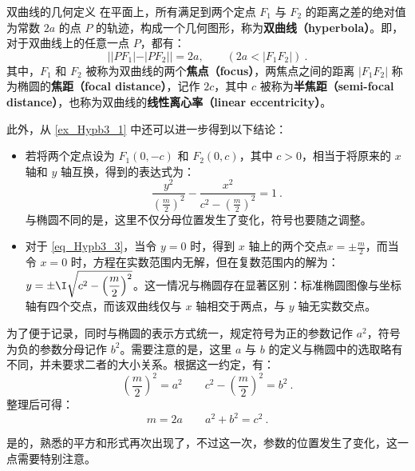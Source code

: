 \begin{definition}{双曲线的几何定义}
在平面上，所有满足到两个定点 $F_1$ 与 $F_2$ 的距离之差的绝对值为常数 $2a$ 的点 $P$ 的轨迹，构成一个几何图形，称为\textbf{双曲线（hyperbola）}。即，对于双曲线上的任意一点 $P$，都有：
\begin{equation}
||PF_1| - |PF_2|| = 2a ,\qquad(2a<|F_1F_2|)~.
\end{equation}
其中，$F_1$ 和 $F_2$ 被称为双曲线的两个\textbf{焦点（focus）}，两焦点之间的距离 $|F_1F_2|$ 称为椭圆的\textbf{焦距（focal distance）}，记作 $2c$，其中 $c$ 被称为\textbf{半焦距（semi-focal distance）}，也称为双曲线的\textbf{线性离心率（linear eccentricity）}。
\end{definition}

此外，从 \autoref{ex_Hypb3_1} 中还可以进一步得到以下结论：

\begin{itemize}
\item 若将两个定点设为 $F_1(0,-c)$ 和 $F_2(0,c)$，其中 $c > 0$，相当于将原来的 $x$ 轴和 $y$ 轴互换，得到的表达式为：
\begin{equation}\label{eq_Hypb3_7}
\frac{y^2}{\left(\displaystyle\frac{m}{2}\right)^2}-\frac{x^2}{\displaystyle c^2-\left(\frac{m}{2}\right)^2} =1~.
\end{equation}
与椭圆不同的是，这里不仅分母位置发生了变化，符号也要随之调整。
\item 对于 \autoref{eq_Hypb3_3}，当令 $y = 0$ 时，得到 $x$ 轴上的两个交点$\displaystyle x = \pm \frac{m}{2}$，而当令 $x = 0$ 时，方程在实数范围内无解，但在复数范围内的解为：$y = \displaystyle\pm \I \sqrt{c^2 - \left( \frac{m}{2} \right)^2}$。这一情况与椭圆存在显著区别：标准椭圆图像与坐标轴有四个交点，而该双曲线仅与 $x$ 轴相交于两点，与 $y$ 轴无实数交点。
\end{itemize}

为了便于记录，同时与椭圆的表示方式统一，规定符号为正的参数记作 $a^2$，符号为负的参数分母记作 $b^2$。需要注意的是，这里 $a$ 与 $b$ 的定义与椭圆中的选取略有不同，并未要求二者的大小关系。根据这一约定，有：
\begin{equation}
\left(\displaystyle\frac{m}{2}\right)^2=a^2\qquad c^2-\displaystyle\left(\frac{m}{2}\right)^2=b^2~.
\end{equation}
整理后可得：
\begin{equation}
m=2a\qquad a^2+b^2=c^2~.
\end{equation}

是的，熟悉的平方和形式再次出现了，不过这一次，参数的位置发生了变化，这一点需要特别注意。


